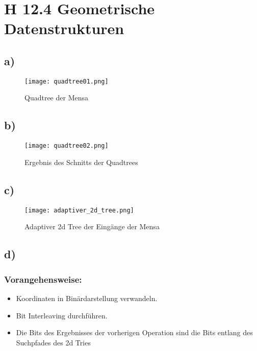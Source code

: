 \documentclass[a4paper]{article}
\begin{document}
\section*{H 12.4 Geometrische Datenstrukturen}

\subsection*{a)}

\begin{figure}[!h]
	\begin{center}
		\texttt{[image: quadtree01.png]}
	\end{center}
	\caption{Quadtree der Mensa}
	\label{fig:qtree01}
\end{figure}

\subsection*{b)}

\begin{figure}[!h]
	\begin{center}
		\texttt{[image: quadtree02.png]}
	\end{center}
	\caption{Ergebnis des Schnitts der Quadtrees}
	\label{fig:qtree02}
\end{figure}

\clearpage
\subsection*{c)}

\begin{figure}[!h]
	\begin{center}
		\texttt{[image: adaptiver\_2d\_tree.png]}
	\end{center}
	\caption{Adaptiver 2d Tree der Eingänge der Mensa}
	\label{fig:adapt2dtree01}
\end{figure}

\subsection*{d)}

\subsubsection*{Vorangehensweise:}
\begin{itemize}
	\item Koordinaten in Binärdarstellung verwandeln.
	\item Bit Interleaving durchführen.
	\item Die Bits des Ergebnisses der vorherigen Operation sind die
		Bits entlang des Suchpfades des 2d Tries
\end{itemize}
\end{document}
